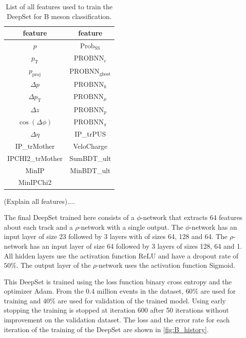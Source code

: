 \begin{table}
    \centering
    \caption{List of all features used to train the DeepSet for B meson classification.}
    \label{tab:B_features}
    \begin{tabular}{c c}
        \toprule
        feature & feature \\
        \midrule
        $p$                 & $\text{Prob}_\text{SS}$ \\ %
        $p_\text{T}$        & $\text{PROBNN}_e$ \\ %
        $p_\text{proj}$     & $\text{PROBNN}_\text{ghost}$ \\ %
        $\Delta p$          & $\text{PROBNN}_k$ \\ %
        $\Delta p_\text{T}$ & $\text{PROBNN}_\mu$ \\ %
        $\Delta z$          & $\text{PROBNN}_p$ \\ %
        $\cos(\Delta \phi)$ & $\text{PROBNN}_\pi$ \\ %
        $\Delta \eta$       & IP\_trPUS \\ %
        IP\_trMother        & VeloCharge \\ %
        IPCHI2\_trMother    & SumBDT\_ult \\ %
        MinIP               & MinBDT\_ult \\ %
        MinIPChi2           & \\ %
        \bottomrule
    \end{tabular}
\end{table}

(Explain all features)....

The final DeepSet trained here consists of a $\phi$-network that extracts 64 features about each track and a $\rho$-network with a single output.
The $\phi$-network has an input layer of size 23 followed by 3 layers with of sizes 64, 128 and 64.
The $\rho$-network has an input layer of size 64 followed by 3 layers of sizes 128, 64 and 1.
All hidden layers use the activation function ReLU and have a dropout rate of $50\%$.
The output layer of the $\rho$-network uses the activation function Sigmoid.

This DeepSet is trained using the loss function binary cross entropy and the optimizer Adam.
From the $0.4$ million events in the dataset, $60\%$ are used for training and $40\%$ are used for validation of the trained model.
Using early stopping the training is stopped at iteration 600 after 50 iterations without improvement on the validation dataset.
The loss and the error rate for each iteration of the training of the DeepSet are shown in \autoref{fig:B_history}.


